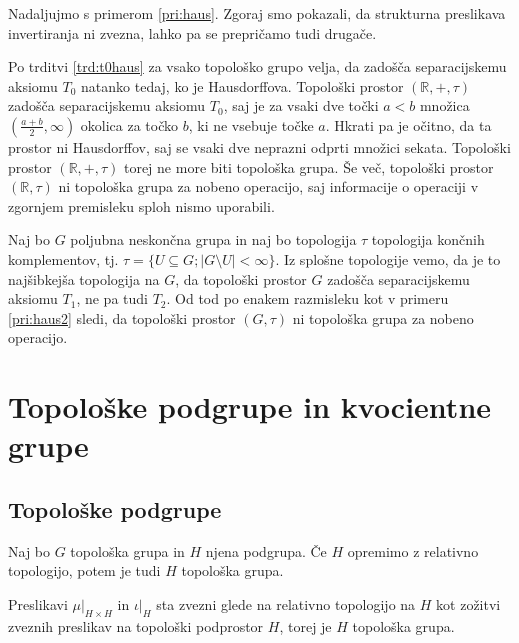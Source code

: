 \documentclass[mat1]{fmfdelo}
\newcommand{\R}{\mathbb R}
\begin{document}
\begin{primer}\label{pri:haus2}
Nadaljujmo s primerom \ref{pri:haus}.
	Zgoraj smo pokazali, da strukturna preslikava invertiranja ni zvezna, lahko pa se prepričamo tudi drugače.
	
	Po trditvi \ref{trd:t0haus} za vsako topološko grupo velja, da zadošča separacijskemu aksiomu $T_0$ natanko tedaj, ko je Hausdorffova. Topološki prostor $(\R, +, \tau)$ zadošča separacijskemu aksiomu $T_0$, saj je za vsaki dve točki $a < b$ množica $(\frac{a+b}{2}, \infty)$ okolica za točko $b$, ki ne vsebuje točke $a$. Hkrati pa je očitno, da ta prostor ni Hausdorffov, saj se vsaki dve neprazni odprti množici sekata. Topološki prostor $(\R, +, \tau)$ torej ne more biti topološka grupa. Še več, topološki prostor $(\R, \tau)$ ni topološka grupa za nobeno operacijo, saj informacije o operaciji v zgornjem premisleku sploh nismo uporabili.
\end{primer}

\begin{primer}
Naj bo $G$ poljubna neskončna grupa in naj bo topologija $\tau$ topologija končnih komplementov, tj. $\tau = \lbrace U \subseteq G ; |G\setminus U| < \infty \rbrace$.
Iz splošne topologije vemo, da je to najšibkejša topologija na $G$, da topološki prostor $G$ zadošča separacijskemu aksiomu $T_1$, ne pa tudi $T_2$. Od tod po enakem razmisleku kot v primeru \ref{pri:haus2} sledi, da topološki prostor $(G, \tau)$ ni topološka grupa za nobeno operacijo.
\end{primer}

\section{Topološke podgrupe in kvocientne grupe}

\subsection{Topološke podgrupe}

\begin{trditev}\label{trd:toppodgrupa}
Naj bo $G$ topološka grupa in $H$ njena podgrupa. Če $H$ opremimo z relativno topologijo, potem je tudi $H$ topološka grupa.
\end{trditev}

\begin{dokaz}
Preslikavi $\mu|_{H \times H}$ in $\iota|_H$ sta zvezni glede na relativno topologijo na $H$ kot zožitvi zveznih preslikav na topološki podprostor $H$, torej je $H$ topološka grupa.
\end{dokaz}
\end{document}
